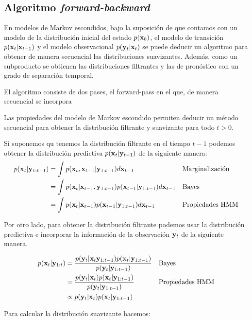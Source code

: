 \subsection{Algoritmo \textit{forward-backward}}

En modelos de Markov escondidos, bajo la suposición de que contamos con un modelo de la distribución inicial del estado $p(\mathbf{x}_0)$, el modelo de transición $p(\mathbf{x}_t | \mathbf{x}_{t-1})$ y el modelo observacional $p(\mathbf{y}_t | \mathbf{x}_t)$ se puede deducir un algoritmo para obtener de manera secuencial las distribuciones suavizantes. Además, como un subproducto se obtienen las distribuciones filtrantes y las de pronóstico con un grado de separación temporal. 

El algoritmo consiste de dos pases, el forward-pass en el que, de manera secuencial se incorpora

Las propiedades del modelo de Markov escondido permiten deducir un método secuencial para obtener la distribución filtrante y suavizante para todo $t > 0$.

Si suponemos qu tenemos la distribución filtrante en el tiempo $t-1$ podemos obtener la distribución predictiva $p(\mathbf{x}_t | \mathbf{y}_{t-1})$ de la siguiente manera:
\begin{align}
    p(\mathbf{x}_t | \mathbf{y}_{1:t-1}) &= \int p(\mathbf{x}_t, \mathbf{x}_{t-1} | \mathbf{y}_{1:t-1}) d\mathbf{x}_{t-1} && \text{Marginalización}\\
    &= \int p(\mathbf{x}_t | \mathbf{x}_{t-1}, \mathbf{y}_{1:t-1}) p(\mathbf{x}_{t-1} | \mathbf{y}_{1:t-1}) d\mathbf{x}_{t-1} && \text{Bayes}\\
    &=\int p(\mathbf{x}_t | \mathbf{x}_{t-1}) p(\mathbf{x}_{t-1} | \mathbf{y}_{1:t-1}) d\mathbf{x}_{t-1} && \text{Propiedades HMM}
\end{align}

Por otro lado, para obtener la distribución filtrante podemos usar la distribución predictiva e incorporar la información de la observación $\mathbf{y}_t$ de la siguiente manera.

\begin{align}
    p(\mathbf{x}_t | \mathbf{y}_{1:t}) &= \frac
            {p(\mathbf{y}_t | \mathbf{x}_t \mathbf{y}_{1:t-1}) p(\mathbf{x}_t | \mathbf{y}_{1:t-1})}
            {p(\mathbf{y}_t | \mathbf{y}_{1:t-1})} && \text{Bayes}\\
    &= \frac{p(\mathbf{y}_t | \mathbf{x}_t) p(\mathbf{x}_t | \mathbf{y}_{1:t-1})}
            {p(\mathbf{y}_t | \mathbf{y}_{1:t-1})} && \text{Propiedades HMM}\\
    &\propto p(\mathbf{y}_t | \mathbf{x}_t) p(\mathbf{x}_t | \mathbf{y}_{1:t-1})
\end{align}

Para calcular la distribución suavizante hacemos:

